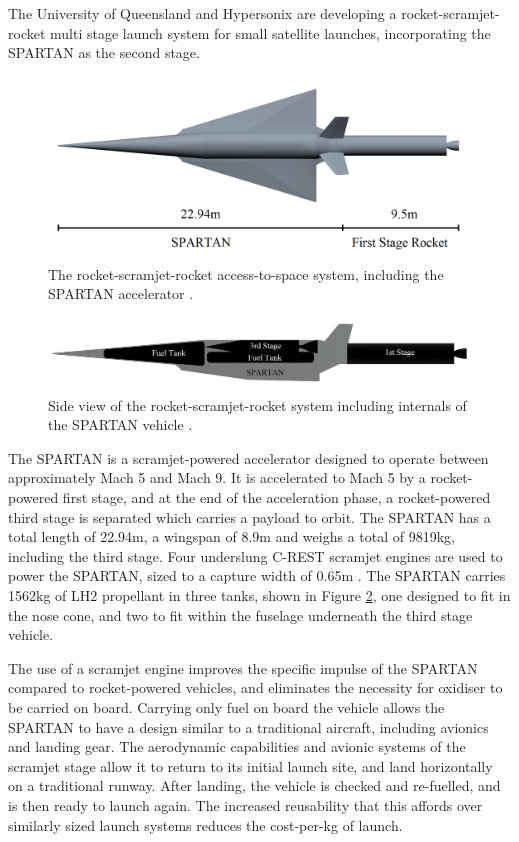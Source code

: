 \documentclass[journal]{new-aiaa} %
\begin{document}
 The University of Queensland and Hypersonix are developing a rocket-scramjet-rocket multi stage launch system for small satellite launches, incorporating the SPARTAN\cite{Preller2017} as the second stage. 
\begin{figure}
	\centering
	\includegraphics[width=0.7\linewidth]{Figures/NoInternal}
	\caption{The rocket-scramjet-rocket access-to-space system, including the SPARTAN accelerator \cite{ForbesSpyratos2018}.}
	\label{fig:NoInternal}
\end{figure}
\begin{figure}
	\centering
	\includegraphics[width=0.7\linewidth]{Figures/INTERNALS}
	\caption{Side view of the rocket-scramjet-rocket system including internals of the SPARTAN vehicle \cite{ForbesSpyratos2018}.}
	\label{fig:INTERNALS}
\end{figure}
The SPARTAN is a scramjet-powered accelerator designed to operate between approximately Mach 5 and Mach 9. It is accelerated to Mach 5 by a rocket-powered first stage, and at the end of the acceleration phase, a rocket-powered third stage is separated which carries a payload to orbit.
The SPARTAN has a total length of 22.94m, a wingspan of 8.9m and weighs a total of 9819kg, including the third stage.  
Four underslung C-REST scramjet engines are used to power the SPARTAN, sized to a capture width of 0.65m \cite{Preller2017}.
The SPARTAN carries 1562kg of LH2 propellant in three tanks, shown in Figure \ref{fig:INTERNALS}, one designed to fit in the nose cone, and two to fit within the fuselage underneath the third stage vehicle. 



The use of a scramjet engine improves the specific impulse of the SPARTAN compared to rocket-powered vehicles, and eliminates the necessity for oxidiser to be carried on board. Carrying only fuel on board the vehicle allows the SPARTAN to have a design similar to a traditional aircraft, including avionics and landing gear. The aerodynamic capabilities and avionic systems of the scramjet stage allow it to return to its initial launch site, and land horizontally on a traditional runway. After landing, the vehicle is checked and re-fuelled, and is then ready to launch again. The increased reusability that this affords over similarly sized launch systems reduces the cost-per-kg of launch. 
\end{document}
